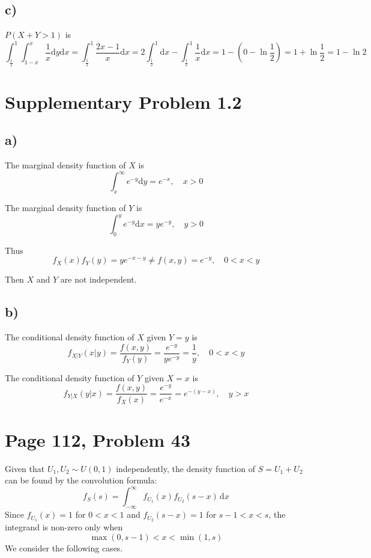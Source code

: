 \documentclass[a4paper, UTF-8]{article}
\theoremstyle{plain}
\begin{document}
\subsection{c)} 

$P(X + Y > 1)$ is 
$$
\int_{\frac{1}{2}}^1 \int_{1-x}^x \frac{1}{x} \mathrm{d}y \mathrm{d}x = \int_{\frac{1}{2}}^1 \frac{2x - 1}{x} \mathrm{d}x = 2\int_{\frac{1}{2}}^1 \mathrm{d}x - \int_{\frac{1}{2}}^1 \frac{1}{x} \mathrm{d}x = 1 - (0 - \ln \frac{1}{2}) = 1 + \ln \frac{1}{2} = 1 - \ln 2
$$

\section{Supplementary Problem 1.2} 

\subsection{a)}

The marginal density function of $X$ is
$$
\int_{x}^\infty e^{-y} \mathrm{d}y = e^{-x}, \quad x > 0
$$

The marginal density function of $Y$ is
$$
\int_{0}^y e^{-y} \mathrm{d}x = ye^{-y}, \quad y > 0
$$

Thus 
$$
f_X(x)f_Y(y) = ye^{-x-y} \ne f(x,y) = e^{-y}, \quad 0 < x < y
$$

Then $X$ and $Y$ are not independent.

\subsection{b)} 

The conditional density function of $X$ given $Y = y$ is
$$
f_{X|Y}(x|y) = \frac{f(x,y)}{f_Y(y)} = \frac{e^{-y}}{ye^{-y}} = \frac{1}{y}, \quad 0 < x < y
$$

The conditional density function of $Y$ given $X = x$ is
$$
f_{Y|X}(y|x) = \frac{f(x,y)}{f_X(x)} = \frac{e^{-y}}{e^{-x}} = e^{-(y-x)}, \quad y > x
$$

\section{Page 112, Problem 43}

Given that $U_1, U_2 \sim U(0, 1)$ independently, the density function of $S = U_1 + U_2$ can be found by the convolution formula:
$$
f_S(s) = \int_{-\infty}^{\infty} f_{U_1}(x) f_{U_2}(s - x) \, \mathrm{d}x
$$
Since $f_{U_1}(x) = 1$ for $0 < x < 1$ and $f_{U_2}(s-x) = 1$ for $s-1 < x < s$, the integrand is non-zero only when
$$
\max(0, s-1) < x < \min(1, s)
$$
We consider the following cases.
\end{document}
